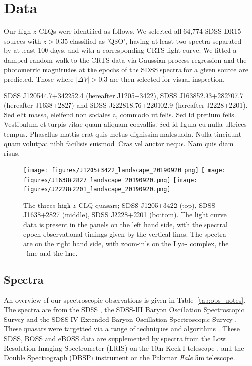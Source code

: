 \documentclass[a4paper,fleqn,usenatbib]{mnras}
\begin{document}
\section{Data}
Our high-$z$ CLQs were identified as follows. 
We selected all 64,774 SDSS DR15 sources with $z > 0.35$ classified as
'QSO', having at least two spectra separated by at least 100 days, and
with a corresponding CRTS light curve. We fitted a damped random walk
to the CRTS data via Gaussian process regression and the photometric
magnitudes at the epochs of the SDSS spectra for a given source are
predicted. Those where $|\Delta V| > 0.3$ are then selected for visual
inspection.

SDSS J120544.7+342252.4  (hereafter J1205+3422), 
SDSS J163852.93+282707.7 (hereafter J1638+2827) and
SDSS J222818.76+220102.9 (hereafter J2228+2201). 
Sed elit massa, eleifend non sodales a, commodo ut felis. Sed id
pretium felis. Vestibulum et turpis vitae quam aliquam convallis. Sed
id ligula eu nulla ultrices tempus. Phasellus mattis erat quis metus
dignissim malesuada. Nulla tincidunt quam volutpat nibh facilisis
euismod. Cras vel auctor neque. Nam quis diam risus.




\begin{figure}
  \centering
  \texttt{[image: figures/J1205+3422\_landscape\_20190920.png]}
  \texttt{[image: figures/J1638+2827\_landscape\_20190920.png]}
  \texttt{[image: figures/J2228+2201\_landscape\_20190920.png]}
  \vspace{-12pt}
  \caption[]{The threes high-$z$ CLQ quasars; 
    SDSS J1205+3422 (top), 
    SDSS J1638+2827 (middle), 
    SDSS J2228+2201 (bottom). 
The light curve data is present in the panels on the left hand side, with the 
spectral epoch observational timings given by the vertical lines. 
The spectra are on the right hand side, with zoom-in's on the Ly$\alpha$-\nv 
complex, the \civ\ line and the \mgii line. 
  }
  \label{fig:civ_clqs}
\end{figure}
\subsection{Spectra}
An overview of our spectroscopic observations is given in
Table~\ref{tab:obs_notes}.  The spectra are from the SDSS
\citep{Stoughton2002, DR7, Schneider2010}, the SDSS-III Baryon
Oscillation Spectroscopic Survey \citep[BOSS][]{Eisenstein2011,
Dawson2013, Smee2013, Alam2015, Paris2017} and the SDSS-IV Extended
Baryon Oscillation Spectroscopic Survey \citep[eBOSS; ][]{Dawson2016,
Abolfathi2018, Paris2018}.  These quasars were targetted via a range
of techniques and algorithms \citep[see ][]{Richards2002, Ross2012,
Myers2015}. These SDSS, BOSS and eBOSS data are supplemented by
spectra from the Low Resolution Imaging Spectrometer (LRIS) on the 10m
Keck {\sc I} telescope \citep{Oke1995}.  and the Double Spectrograph
(DBSP) instrument on the Palomar {\it Hale} 5m telescope.
\end{document}
